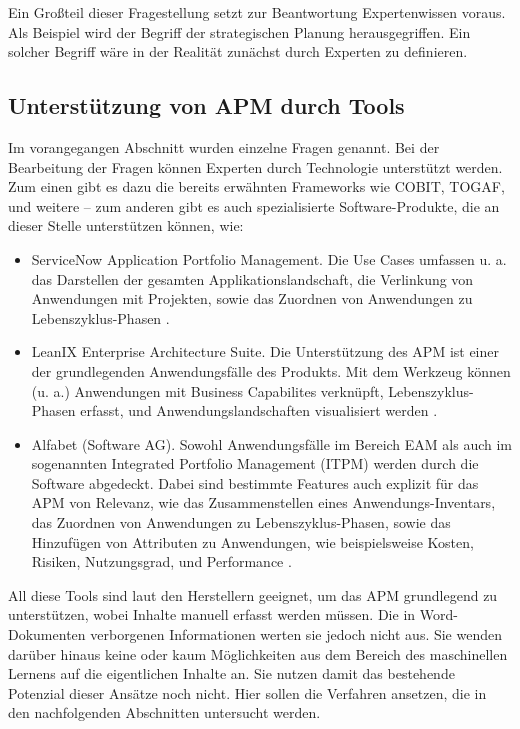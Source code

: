 Ein Großteil dieser Fragestellung setzt zur Beantwortung Expertenwissen voraus. Als Beispiel wird der Begriff der strategischen Planung herausgegriffen. Ein solcher Begriff wäre in der Realität zunächst durch Experten zu definieren. 

\subsection{Unterstützung von APM durch Tools}
Im vorangegangen Abschnitt wurden einzelne Fragen genannt. Bei der Bearbeitung der Fragen können  Experten durch Technologie unterstützt werden. Zum einen gibt es dazu die bereits erwähnten Frameworks wie COBIT, TOGAF, und weitere – zum anderen gibt es auch spezialisierte Software-Produkte, die an dieser Stelle unterstützen können, wie:

\begin{itemize}
\item ServiceNow Application Portfolio Management. Die Use Cases umfassen u. a. das Darstellen der gesamten Applikationslandschaft, die Verlinkung von Anwendungen mit Projekten, sowie das Zuordnen von Anwendungen zu Lebenszyklus-Phasen \cite{servicenow}.
\item LeanIX Enterprise Architecture Suite. Die Unterstützung des APM ist einer der grundlegenden Anwendungsfälle des Produkts. Mit dem Werkzeug können (u. a.) Anwendungen mit Business Capabilites verknüpft, Lebenszyklus-Phasen erfasst, und Anwendungslandschaften visualisiert werden \cite{leanix}.
\item Alfabet (Software AG). Sowohl Anwendungsfälle im Bereich EAM als auch im sogenannten Integrated Portfolio Management (ITPM) werden durch die Software abgedeckt. Dabei sind bestimmte Features auch explizit für das APM von Relevanz, wie das Zusammenstellen eines Anwendungs-Inventars, das Zuordnen von Anwendungen zu Lebenszyklus-Phasen, sowie das Hinzufügen von Attributen zu Anwendungen, wie beispielsweise Kosten, Risiken, Nutzungsgrad, und Performance \cite{softwareag}.
\end{itemize} 

All diese Tools sind laut den Herstellern geeignet, um das APM grundlegend zu unterstützen, wobei Inhalte manuell erfasst werden müssen. Die in Word-Dokumenten verborgenen Informationen werten sie jedoch nicht aus. Sie wenden darüber hinaus keine oder kaum Möglichkeiten aus dem Bereich des maschinellen Lernens auf die eigentlichen Inhalte an. Sie nutzen damit das bestehende Potenzial dieser Ansätze noch nicht. Hier sollen die Verfahren ansetzen, die in den nachfolgenden Abschnitten untersucht werden.

